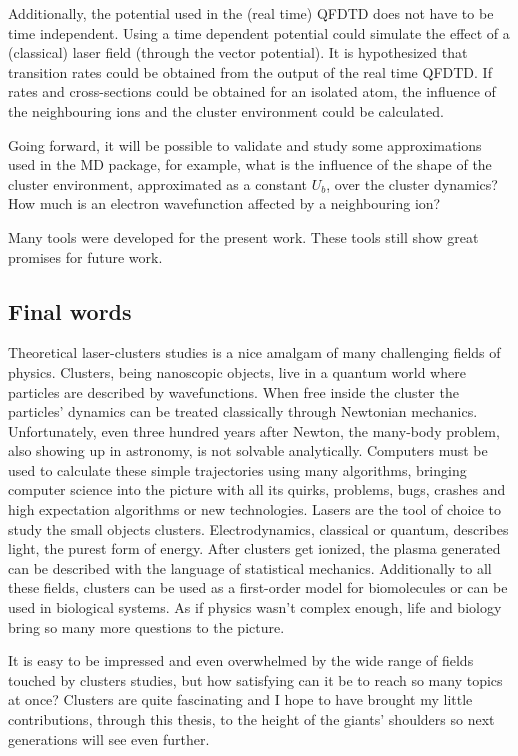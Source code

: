 Additionally, the potential used in the (real time) QFDTD does not have to be
time independent. Using a time dependent potential could simulate the effect of
a (classical) laser field (through the vector potential). It is hypothesized
that transition rates could be obtained from the output of the real time QFDTD.
If rates and cross-sections could be obtained for an isolated atom, the
influence of the neighbouring ions and the cluster environment could be
calculated.

Going forward, it will
be possible to validate and study some approximations used in the MD package,
for example, what is the influence of the shape of the cluster environment,
approximated as a constant $U_b$, over the cluster dynamics? How much is
an electron wavefunction affected by a neighbouring ion?

Many tools were developed for the present work. These tools still show
great promises for future work.



\subsection{Final words}

Theoretical laser-clusters studies is a nice amalgam of many challenging
fields of physics. Clusters, being nanoscopic objects, live in a quantum world
where particles are described by wavefunctions. When free inside the cluster
the particles' dynamics can be treated classically through Newtonian mechanics.
Unfortunately, even three hundred years after Newton, the many-body problem,
also showing up in astronomy, is not solvable analytically.
Computers must be used to calculate these simple trajectories
using many algorithms, bringing computer science into the picture
with all its quirks, problems, bugs, crashes and high expectation algorithms or
new technologies. Lasers are the tool of choice to study the small objects
clusters. Electrodynamics, classical or quantum, describes light, the purest
form of energy. After clusters get ionized,
the plasma generated can be described with the language of statistical mechanics.
Additionally to all these fields, clusters can be used as a first-order model
for biomolecules or can be used in biological systems. As if physics wasn't
complex enough, life and biology bring so many more questions to the picture.

It is easy to be impressed and even overwhelmed by the wide range of fields
touched by clusters studies, but how satisfying can it be to reach so many
topics at once? Clusters are quite fascinating and I hope to have
brought my little contributions, through this thesis, to the height of the giants'
shoulders so next generations will see even further.
